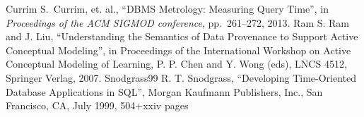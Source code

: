 \documentclass[conference]{IEEEtran}
\begin{document}

\newcommand{\etalchar}[1]{$^{#1}$}
\begin{thebibliography}{99}

\vspace{0.1em}
\bibitem
{Currim}
S.~Currim, et. al., ``DBMS Metrology: Measuring Query Time'', in {\em Proceedings of the ACM SIGMOD conference},
pp.~261--272, 2013.
\bibitem
{Ram}
S. Ram and J. Liu, ``Understanding the Semantics of Data Provenance to Support Active 
Conceptual Modeling'', in {Proceedings of the International Workshop on Active Conceptual
Modeling of Learning}, P. P. Chen and Y. Wong (eds), LNCS 4512, Springer Verlag, 2007.
\bibitem
{Snodgrass99}
R. T. Snodgrass, ``Developing Time-Oriented Database Applications in SQL'', Morgan
Kaufmann Publishers, Inc., San Francisco, CA, July 1999, 504+xxiv pages
\end{thebibliography}
\end{document}
